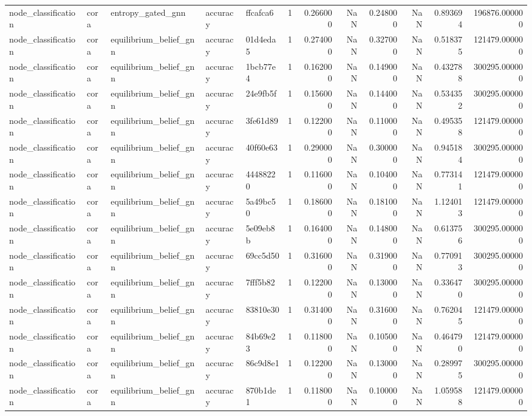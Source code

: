 \begin{tabular}{lllllrrrrrrr}
node_classification & cora & entropy_gated_gnn & accuracy & ffcafca6 & 1 & 0.266000 & NaN & 0.248000 & NaN & 0.893694 & 196876.000000 \\
node_classification & cora & equilibrium_belief_gnn & accuracy & 01d4eda5 & 1 & 0.274000 & NaN & 0.327000 & NaN & 0.518375 & 121479.000000 \\
node_classification & cora & equilibrium_belief_gnn & accuracy & 1bcb77e4 & 1 & 0.162000 & NaN & 0.149000 & NaN & 0.432788 & 300295.000000 \\
node_classification & cora & equilibrium_belief_gnn & accuracy & 24e9fb5f & 1 & 0.156000 & NaN & 0.144000 & NaN & 0.534352 & 300295.000000 \\
node_classification & cora & equilibrium_belief_gnn & accuracy & 3fe61d89 & 1 & 0.122000 & NaN & 0.110000 & NaN & 0.495358 & 121479.000000 \\
node_classification & cora & equilibrium_belief_gnn & accuracy & 40f60e63 & 1 & 0.290000 & NaN & 0.300000 & NaN & 0.945184 & 300295.000000 \\
node_classification & cora & equilibrium_belief_gnn & accuracy & 44488220 & 1 & 0.116000 & NaN & 0.104000 & NaN & 0.773141 & 121479.000000 \\
node_classification & cora & equilibrium_belief_gnn & accuracy & 5a49bc50 & 1 & 0.186000 & NaN & 0.181000 & NaN & 1.124013 & 121479.000000 \\
node_classification & cora & equilibrium_belief_gnn & accuracy & 5e09eb8b & 1 & 0.164000 & NaN & 0.148000 & NaN & 0.613756 & 300295.000000 \\
node_classification & cora & equilibrium_belief_gnn & accuracy & 69cc5d50 & 1 & 0.316000 & NaN & 0.319000 & NaN & 0.770913 & 300295.000000 \\
node_classification & cora & equilibrium_belief_gnn & accuracy & 7fff5b82 & 1 & 0.122000 & NaN & 0.130000 & NaN & 0.336470 & 300295.000000 \\
node_classification & cora & equilibrium_belief_gnn & accuracy & 83810e30 & 1 & 0.314000 & NaN & 0.316000 & NaN & 0.762045 & 121479.000000 \\
node_classification & cora & equilibrium_belief_gnn & accuracy & 84b69e23 & 1 & 0.118000 & NaN & 0.105000 & NaN & 0.464790 & 121479.000000 \\
node_classification & cora & equilibrium_belief_gnn & accuracy & 86c9d8e1 & 1 & 0.122000 & NaN & 0.130000 & NaN & 0.289975 & 300295.000000 \\
node_classification & cora & equilibrium_belief_gnn & accuracy & 870b1de1 & 1 & 0.118000 & NaN & 0.100000 & NaN & 1.059588 & 121479.000000 \\

\end{tabular}
